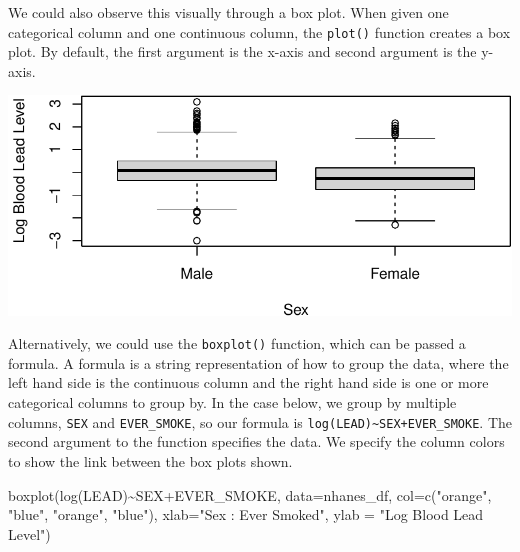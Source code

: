 \documentclass[
  letterpaper,
]{krantz}
\makeatletter
\newenvironment{Shaded}{\begin{snugshade}}{\end{snugshade}}
\newcommand{\AttributeTok}[1]{\textcolor[rgb]{0.40,0.45,0.13}{#1}}
\newcommand{\FunctionTok}[1]{\textcolor[rgb]{0.28,0.35,0.67}{#1}}
\newcommand{\NormalTok}[1]{\textcolor[rgb]{0.00,0.23,0.31}{#1}}
\newcommand{\SpecialCharTok}[1]{\textcolor[rgb]{0.37,0.37,0.37}{#1}}
\newcommand{\StringTok}[1]{\textcolor[rgb]{0.13,0.47,0.30}{#1}}
\newenvironment{kframe}{%
\medskip{}
\setlength{\fboxsep}{.8em}
 \def\at@end@of@kframe{}%
 \ifinner\ifhmode%
  \def\at@end@of@kframe{\end{minipage}}%
  \begin{minipage}{\columnwidth}%
 \fi\fi%
 \def\FrameCommand##1{\hskip\@totalleftmargin \hskip-\fboxsep
 \colorbox{shadecolor}{##1}\hskip-\fboxsep
     \hskip-\linewidth \hskip-\@totalleftmargin \hskip\columnwidth}%
 \MakeFramed {\advance\hsize-\width
   \@totalleftmargin\z@ \linewidth\hsize
   \@setminipage}}%
 {\par\unskip\endMakeFramed%
 \at@end@of@kframe}
\renewenvironment{Shaded}{\begin{kframe}}{\end{kframe}}
\makeatother
\begin{document}
We could also observe this visually through a box plot. When given one
categorical column and one continuous column, the \texttt{plot()}
function creates a box plot. By default, the first argument is the
x-axis and second argument is the y-axis.

\begin{Shaded}
\end{Shaded}

\begin{center}
\includegraphics[width=1\textwidth,height=\textheight]{book/exploratory_analysis_files/figure-pdf/unnamed-chunk-15-1.pdf}
\end{center}

Alternatively, we could use the \texttt{boxplot()} function, which can
be passed a formula. A formula is a string representation of how to
group the data, where the left hand side is the continuous column and
the right hand side is one or more categorical columns to group by. In
the case below, we group by multiple columns, \texttt{SEX} and
\texttt{EVER\_SMOKE}, so our formula is
\texttt{log(LEAD)\textasciitilde{}SEX+EVER\_SMOKE}. The second argument
to the function specifies the data. We specify the column colors to show
the link between the box plots shown.

\begin{Shaded}
\begin{Highlighting}[]
\FunctionTok{boxplot}\NormalTok{(}\FunctionTok{log}\NormalTok{(LEAD)}\SpecialCharTok{\textasciitilde{}}\NormalTok{SEX}\SpecialCharTok{+}\NormalTok{EVER\_SMOKE, }\AttributeTok{data=}\NormalTok{nhanes\_df, }
        \AttributeTok{col=}\FunctionTok{c}\NormalTok{(}\StringTok{"orange"}\NormalTok{, }\StringTok{"blue"}\NormalTok{, }\StringTok{"orange"}\NormalTok{, }\StringTok{"blue"}\NormalTok{),}
        \AttributeTok{xlab=}\StringTok{"Sex : Ever Smoked"}\NormalTok{, }\AttributeTok{ylab =} \StringTok{"Log Blood Lead Level"}\NormalTok{)}
\end{Highlighting}
\end{Shaded}
\end{document}
